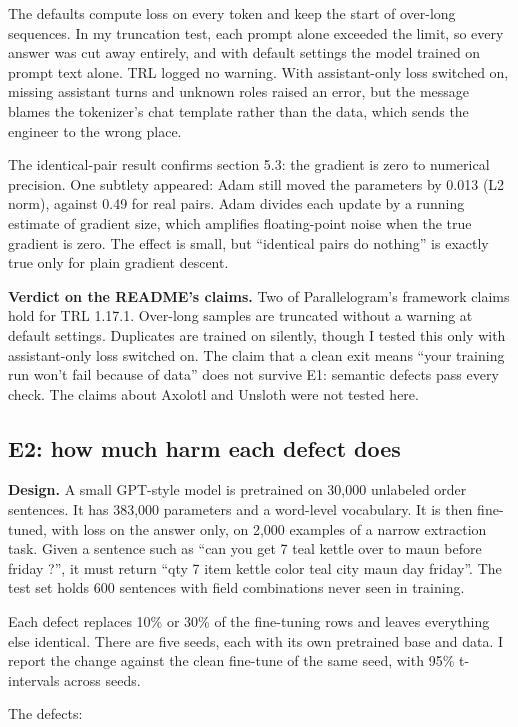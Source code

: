 The defaults compute loss on every token and keep the start of over-long sequences. In my truncation test, each prompt alone exceeded the limit, so every answer was cut away entirely, and with default settings the model trained on prompt text alone. TRL logged no warning. With assistant-only loss switched on, missing assistant turns and unknown roles raised an error, but the message blames the tokenizer's chat template rather than the data, which sends the engineer to the wrong place.

The identical-pair result confirms section 5.3: the gradient is zero to numerical precision. One subtlety appeared: Adam still moved the parameters by 0.013 (L2 norm), against 0.49 for real pairs. Adam divides each update by a running estimate of gradient size, which amplifies floating-point noise when the true gradient is zero. The effect is small, but ``identical pairs do nothing'' is exactly true only for plain gradient descent.

\textbf{Verdict on the README's claims.} Two of Parallelogram's framework claims hold for TRL 1.17.1. Over-long samples are truncated without a warning at default settings. Duplicates are trained on silently, though I tested this only with assistant-only loss switched on. The claim that a clean exit means ``your training run won't fail because of data'' does not survive E1: semantic defects pass every check. The claims about Axolotl and Unsloth were not tested here.

\subsection{E2: how much harm each defect does}

\textbf{Design.} A small GPT-style model is pretrained on 30,000 unlabeled order sentences. It has 383,000 parameters and a word-level vocabulary. It is then fine-tuned, with loss on the answer only, on 2,000 examples of a narrow extraction task. Given a sentence such as ``can you get 7 teal kettle over to maun before friday ?'', it must return ``qty 7 item kettle color teal city maun day friday''. The test set holds 600 sentences with field combinations never seen in training.

Each defect replaces 10\% or 30\% of the fine-tuning rows and leaves everything else identical. There are five seeds, each with its own pretrained base and data. I report the change against the clean fine-tune of the same seed, with 95\% t-intervals across seeds.

The defects:

